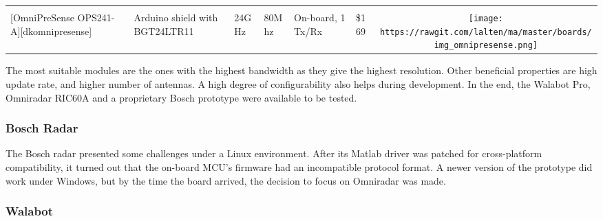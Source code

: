 \begin{longtable}[]{@{}llllllc@{}}
\begin{minipage}[t]{0.10\columnwidth}
\end{minipage}\tabularnewline
\begin{minipage}[t]{0.09\columnwidth}\raggedright\strut
{[}OmniPreSense OPS241-A{]}{[}dkomnipresense{]}\strut
\end{minipage} & \begin{minipage}[t]{0.13\columnwidth}\raggedright\strut
Arduino shield with BGT24LTR11\strut
\end{minipage} & \begin{minipage}[t]{0.09\columnwidth}\raggedright\strut
24GHz\strut
\end{minipage} & \begin{minipage}[t]{0.11\columnwidth}\raggedright\strut
80Mhz\strut
\end{minipage} & \begin{minipage}[t]{0.10\columnwidth}\raggedright\strut
On-board, 1 Tx/Rx\strut
\end{minipage} & \begin{minipage}[t]{0.15\columnwidth}\raggedright\strut
\$169\strut
\end{minipage} & \begin{minipage}[t]{0.10\columnwidth}\centering\strut
\texttt{[image: https://rawgit.com/lalten/ma/master/boards/img\_omnipresense.png]}\strut
\end{minipage}\tabularnewline
\bottomrule
\end{longtable}

The most suitable modules are the ones with the highest bandwidth as
they give the highest resolution. Other beneficial properties are high
update rate, and higher number of antennas. A high degree of
configurability also helps during development. In the end, the Walabot
Pro, Omniradar RIC60A and a proprietary Bosch prototype were available
to be tested.

\subsubsection{Bosch Radar}\label{bosch-radar}

The Bosch radar presented some challenges under a Linux environment.
After its Matlab driver was patched for cross-platform compatibility, it
turned out that the on-board MCU's firmware had an incompatible protocol
format. A newer version of the prototype did work under Windows, but by
the time the board arrived, the decision to focus on Omniradar was made.

\subsubsection{Walabot}\label{walabot}

